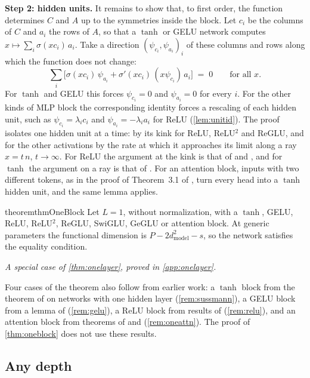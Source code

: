 \documentclass[10pt]{article}
\theoremstyle{definition}
\theoremstyle{remark}
\newcommand{\dm}{d_{\mathrm{model}}}
\newcommand{\para}[1]{\smallskip\noindent\textbf{#1}\hspace{0.5em}}
\newcommand{\specialof}[2]{\par\vspace{-0.4\baselineskip}\noindent\hfill{\small\itshape A special case of \cref{#1}, proved in \cref{#2}.}\par\smallskip}
\begin{document}
\para{Step 2: hidden units.} It remains to show that, to first order, the function determines $C$ and $A$ up to the symmetries inside the block. Let $c_i$ be the columns of $C$ and $a_i$ the rows of $A$, so that a $\tanh$ or GELU network computes $x \mapsto \sum_i \sigma(xc_i)\,a_i$. Take a direction $(\psi_{c_i}, \psi_{a_i})_i$ of these columns and rows along which the function does not change:
\[
\sum_i \Big[\sigma(xc_i)\,\psi_{a_i} + \sigma'(xc_i)\,(x\psi_{c_i})\,a_i\Big] \;=\; 0 \qquad\text{for all } x .
\]
For $\tanh$ and GELU this forces $\psi_{c_i} = 0$ and $\psi_{a_i} = 0$ for every $i$. For the other kinds of MLP block the corresponding identity forces a rescaling of each hidden unit, such as $\psi_{c_i} = \lambda_ic_i$ and $\psi_{a_i} = -\lambda_ia_i$ for ReLU (\cref{lem:unitid}). The proof isolates one hidden unit at a time: by its kink for ReLU, ReLU$^2$ and ReGLU, and for the other activations by the rate at which it approaches its limit along a ray $x = t\,n$, $t \to \infty$. For ReLU the argument at the kink is that of \citet{petzka2020symmetries} and \citet{stock2021embedding}, and for $\tanh$ the argument on a ray is that of \citet{sussmann1992}. For an attention block, inputs with two different tokens, as in the proof of Theorem~3.1 of \citet{tran2025equivariant}, turn every head into a $\tanh$ hidden unit, and the same lemma applies.

\begin{restatable}{theorem}{thmOneBlock}\label{thm:oneblock}
Let $L = 1$, without normalization, with a $\tanh$, GELU, ReLU, ReLU$^2$, ReGLU, SwiGLU, GeGLU or attention block. At generic parameters the functional dimension is $P - 2\dm^2 - s$, so the network satisfies the equality condition.
\end{restatable}
\specialof{thm:onelayer}{app:onelayer}

Four cases of the theorem also follow from earlier work: a $\tanh$ block from the theorem of \citet{sussmann1992} on networks with one hidden layer (\cref{rem:sussmann}), a GELU block from a lemma of \citet{albertini1993discrete} (\cref{rem:gelu}), a ReLU block from results of \citet{stock2021embedding} (\cref{rem:relu}), and an attention block from theorems of \citet{henry2025lightning} and \citet{henry2026generic} (\cref{rem:oneattn}). The proof of \cref{thm:oneblock} does not use these results.

\subsection{Any depth}\label{sec:depth}\label{sec:proof}
\end{document}
